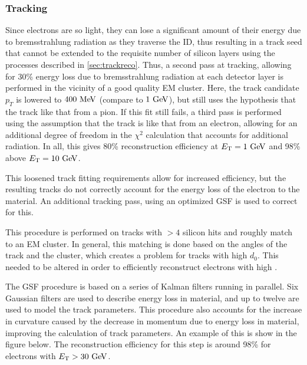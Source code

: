 \subsubsection{Tracking}
Since electrons are so light, they can lose a significant amount of their energy due to bremsstrahlung radiation as they traverse the \ac{ID}, thus resulting in a track seed that cannot be extended to the requisite number of silicon layers using the processes described in \ref{sec:trackreco}. Thus, a second pass at tracking, allowing for 30\% energy loss due to bremsstrahlung radiation at each detector layer is performed in the vicinity of a good quality \ac{EM} cluster. Here, the track candidate $p_{T}$ is lowered to $400 \MeV$ (compare to $1 \GeV$), but still uses the hypothesis that the track like that from a pion. If this fit still fails, a third pass is performed using the assumption that the track is like that from an electron, allowing for an additional degree of freedom in the $\chi^2$ calculation that accounts for additional radiation. In all, this gives 80\% reconstruction efficiency at $\et = 1 \GeV$ and 98\% above $\et = 10 \GeV$. 

This loosened track fitting requirements allow for increased efficiency, but the resulting tracks do not correctly account for the energy loss of the electron to the material. An additional tracking pass, using an optimized \ac{GSF} is used to correct for this. 

This procedure is performed on tracks with $>4$ silicon hits and roughly match to an \ac{EM} cluster. In general, this matching is done based on the angles of the track and the cluster, which creates a problem for tracks with high $d_{0}$. This needed to be altered in order to efficiently reconstruct electrons with high \dzero. 


The \ac{GSF} procedure is based on a series of Kalman filters running in parallel. Six Gaussian filters are used to describe energy loss in material, and up to twelve are used to model the track parameters. This procedure also accounts for the increase in curvature caused by the decrease in momentum due to energy loss in material, improving the calculation of track parameters. An example of this is show in the figure below. The reconstruction efficiency for this step is around 98\% for electrons with $\et > 30 \GeV$. 



